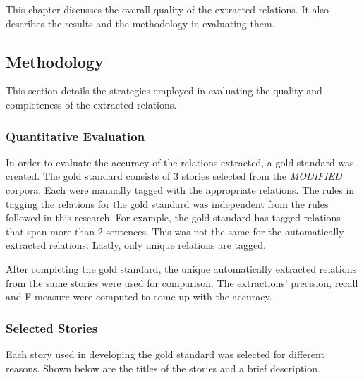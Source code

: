 %
%
%                 

\label{sec:resultsandanalysis}

This chapter discusses the overall quality of the extracted relations. It also describes the results and the methodology in evaluating them.

\subsection{Methodology}
\label{sec:methodology}

This section details the strategies employed in evaluating the quality and completeness of the extracted relations.

\subsubsection{Quantitative Evaluation}

In order to evaluate the accuracy of the relations extracted, a gold standard was created. The gold standard consists of 3 stories selected from the \textit{MODIFIED} corpora. Each were manually tagged with the appropriate relations. The rules in tagging the relations for the gold standard was independent from the rules followed in this research. For example, the gold standard has tagged relations that span more than 2 sentences. This was not the same for the automatically extracted relations. Lastly, only unique relations are tagged.

After completing the gold standard, the unique automatically extracted relations from the same stories were used for comparison. The extractions' precision, recall and F-measure were computed to come up with the accuracy.

\subsubsection*{Selected Stories}

Each story used in developing the gold standard was selected for different reasons. Shown below are the titles of the stories and a brief description.

